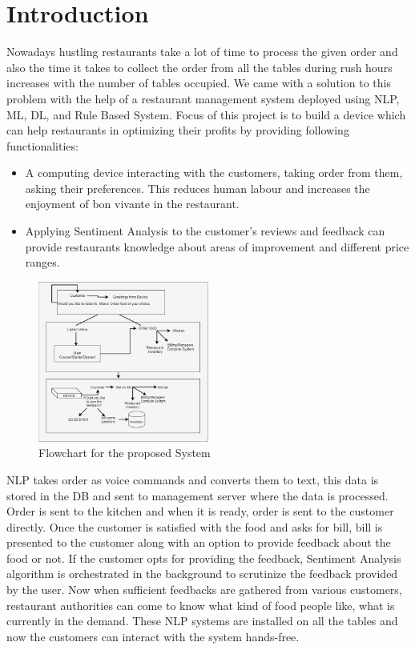 \documentclass[conference]{IEEEtran}
\begin{document}
\section{Introduction}
Nowadays hustling restaurants take a lot of time to process the given order and also the time it takes to collect the order from all the tables during rush hours increases with the number of tables occupied. We came with a solution to this problem with the help of a restaurant management system deployed using NLP, ML, DL, and Rule Based System. 
Focus of this project is to build a device which can help restaurants in optimizing their profits by providing following functionalities:
\begin{itemize}
	\item A computing device interacting with the customers, taking order from them, asking their preferences. This reduces human labour and increases the enjoyment of bon vivante in the restaurant.
	\item Applying Sentiment Analysis to the customer’s reviews and feedback can provide restaurants knowledge about areas of improvement and different price ranges.
\end{itemize}
\begin{figure}[!ht]
	\centering
	\includegraphics[width=0.5\textwidth]{overview.png}
	\caption{ Flowchart for the proposed System}
\end{figure}
NLP takes order as voice commands and converts them to text, this data is stored in the DB and sent to management server where the data is processed. Order is sent to the kitchen and when it is ready, order is sent to the customer directly. Once the customer is satisfied with the food and asks for bill, bill is presented to the customer along with an option to provide feedback about the food or not. If the customer opts for providing the feedback, Sentiment Analysis algorithm is orchestrated in the background to scrutinize the feedback provided by the user. Now when sufficient feedbacks are gathered from various customers, restaurant authorities can come to know what kind of food people like, what is currently in the demand. These NLP systems are installed on all the tables and now the customers can interact with the system hands-free. \\
\end{document}

